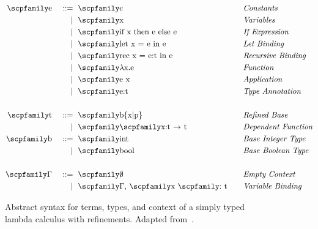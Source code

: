 \documentclass[
  oneside,
  english,
  coorientadorbanca,
  noabntexcite
]{ufsc-thesis-rn46-2019}
\def\bnfdef{::=}
\newcommand{\codett}[1]{\text{\scpfamily#1}}
\newcommand{\code}[1]{\text{\scpfamily\setlength\spaceskip{0.35em}#1}}
\newcommand{\bnfmore}[1]{            & \ & \mid{}    & \ \code{#1}}
\newcommand{\astprod}[2]{\code{#1} & \ & \bnfdef{} & \ \code{#2}}
\newcommand{\astmore}[1]{\bnfmore{#1}}
\newcommand{\typer}[2]{\code{#1 \codett{:} #2}}
\newcommand{\fnty}[2]{\code{#1 $\rightarrow$ #2}}
\begin{document}
\begin{figure}[ht]
  \begin{minipage}{\textwidth}
    \begin{alignat*}{4}
      \astprod{e}{c}                   & \quad & \textit{Constants}          \\
      \astmore{x}                      & \quad & \textit{Variables}          \\
      \astmore{if x then e else e}     & \quad & \textit{If Expression}      \\
      \astmore{let x = e in e}         & \quad & \textit{Let Binding}        \\
      \astmore{rec x = e:t in e}       & \quad & \textit{Recursive Binding}  \\
      \astmore{$\lambda$x.e}           & \quad & \textit{Function}           \\
      \astmore{e x}                    & \quad & \textit{Application}        \\
      \astmore{e:t}                    & \quad & \textit{Type Annotation}    \\
      \\
      \astprod{t}{b\{x|p\}}            & \quad & \textit{Refined Base}       \\
      \astmore{\fnty{x:t}{t}}          & \quad & \textit{Dependent Function} \\
      \astprod{b}{int}                 & \quad & \textit{Base Integer Type}  \\
      \astmore{bool}                   & \quad & \textit{Base Boolean Type}  \\
      \\
      \astprod{$\Gamma$}{$\emptyset$}  & \quad & \textit{Empty Context}      \\
      \astmore{$\Gamma$, \typer{x}{t}} & \quad & \textit{Variable Binding}   \\
    \end{alignat*}
  \end{minipage}
  \caption{
    Abstract syntax for terms, types, and context of a simply typed lambda calculus with refinements.
    Adapted from~\cite{jhala2020tutorial}.
  }\label{fig:refinement_terms}
\end{figure}
\end{document}

